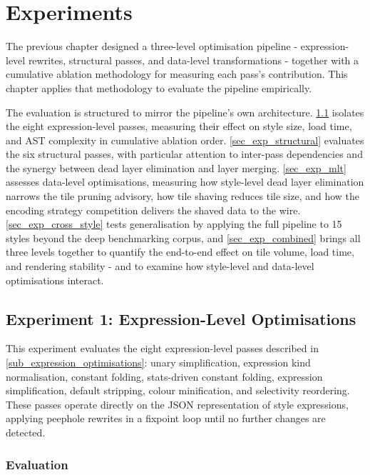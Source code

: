 \chapter{Experiments}\label{ch_experiments}

The previous chapter designed a three-level optimisation pipeline - expression-level rewrites, structural passes, and data-level transformations - together with a cumulative ablation methodology for measuring each pass's contribution.
This chapter applies that methodology to evaluate the pipeline empirically.

The evaluation is structured to mirror the pipeline's own architecture.
\cref{sec_exp_expressions} isolates the eight expression-level passes, measuring their effect on style size, load time, and AST complexity in cumulative ablation order.
\cref{sec_exp_structural} evaluates the six structural passes, with particular attention to inter-pass dependencies and the synergy between dead layer elimination and layer merging.
\cref{sec_exp_mlt} assesses data-level optimisations, measuring how style-level dead layer elimination narrows the tile pruning advisory, how tile shaving reduces tile size, and how the encoding strategy competition delivers the shaved data to the wire.
\cref{sec_exp_cross_style} tests generalisation by applying the full pipeline to 15 styles beyond the deep benchmarking corpus, and \cref{sec_exp_combined} brings all three levels together to quantify the end-to-end effect on tile volume, load time, and rendering stability - and to examine how style-level and data-level optimisations interact.

\section{Experiment 1: Expression-Level Optimisations}\label{sec_exp_expressions}

This experiment evaluates the eight expression-level passes described in \cref{sub_expression_optimisations}: unary simplification, expression kind normalisation, constant folding, stats-driven constant folding, expression simplification, default stripping, colour minification, and selectivity reordering.
These passes operate directly on the JSON representation of style expressions, applying peephole rewrites in a fixpoint loop until no further changes are detected.

\subsection{Evaluation}\label{sub_expr_evaluation}

